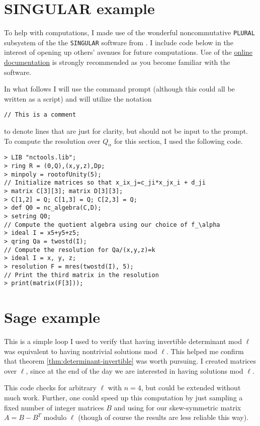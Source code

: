 \documentclass [11pt, proquest] {uwthesis}[2020/02/24]
\begin{document}
\section{SINGULAR example}\label{code:singular-resolution}
To help with computations, I made use of the wonderful noncommutative \texttt{PLURAL} subsystem of the the \texttt{SINGULAR} software from \cite{singular}. I include code below in the interest of opening up others' avenues for future computations. Use of the \href{https://www.singular.uni-kl.de/index.php/singular-manual.html}{online documentation} is strongly recommended as you become familiar with the software.

In what follows I will use the command prompt (although this could all be written as a script) and will utilize the notation
\begin{verbatim}
// This is a comment
\end{verbatim}
to denote lines that are just for clarity, but should not be input to the prompt.
To compute the resolution over $Q_\alpha$ for this section, I used the following code. 
\begin{verbatim}
> LIB "nctools.lib";
> ring R = (0,Q),(x,y,z),Dp;
> minpoly = rootofUnity(5);
// Initialize matrices so that x_ix_j=c_ji*x_jx_i + d_ji
> matrix C[3][3]; matrix D[3][3];
> C[1,2] = Q; C[1,3] = Q; C[2,3] = Q;
> def Q0 = nc_algebra(C,D);
> setring Q0;
// Compute the quotient algebra using our choice of f_\alpha
> ideal I = x5+y5+z5;
> qring Qa = twostd(I);
// Compute the resolution for Qa/(x,y,z)=k
> ideal I = x, y, z;
> resolution F = mres(twostd(I), 5);
// Print the third matrix in the resolution
> print(matrix(F[3]));
\end{verbatim}

\section{Sage example}\label{code:sage-conjecture}
This is a simple loop I used to verify that having invertible determinant mod $\ell$ was equivalent to having nontrivial solutions mod $\ell$. This helped me confirm that theorem \ref{thm:determinant-invertible} was worth pursuing. I created matrices over $\ell$, since at the end of the day we are interested in having solutions mod $\ell$.

This code checks for arbitrary $\ell$ with $n=4$, but could be extended without much work. Further, one could speed up this computation by just sampling a fixed number of integer matrices $B$ and using for our skew-symmetric matrix $A=B-B^T$ modulo $\ell$ (though of course the results are less reliable this way).
\end{document}
